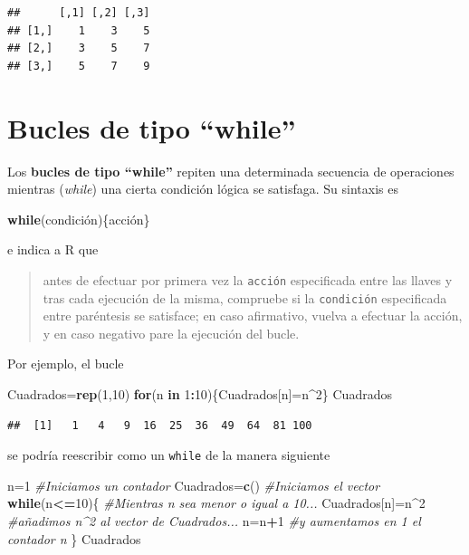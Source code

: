 \documentclass[]{book}
\newenvironment{Shaded}{\begin{snugshade}}{\end{snugshade}}
\newcommand{\CommentTok}[1]{\textcolor[rgb]{0.56,0.35,0.01}{\textit{#1}}}
\newcommand{\ControlFlowTok}[1]{\textcolor[rgb]{0.13,0.29,0.53}{\textbf{#1}}}
\newcommand{\DecValTok}[1]{\textcolor[rgb]{0.00,0.00,0.81}{#1}}
\newcommand{\KeywordTok}[1]{\textcolor[rgb]{0.13,0.29,0.53}{\textbf{#1}}}
\newcommand{\NormalTok}[1]{#1}
\newcommand{\OperatorTok}[1]{\textcolor[rgb]{0.81,0.36,0.00}{\textbf{#1}}}
\theoremstyle{definition}
\theoremstyle{definition}
\theoremstyle{definition}
\theoremstyle{remark}
\begin{document}
\begin{verbatim}
##      [,1] [,2] [,3]
## [1,]    1    3    5
## [2,]    3    5    7
## [3,]    5    7    9
\end{verbatim}

\hypertarget{bucles-de-tipo-while}{%
\section{Bucles de tipo ``while''}\label{bucles-de-tipo-while}}

Los \textbf{bucles de tipo ``while''} repiten una determinada secuencia de operaciones mientras (\emph{while}) una cierta condición lógica se satisfaga. Su sintaxis es

\begin{Shaded}
\begin{Highlighting}[]
\ControlFlowTok{while}\NormalTok{(condición)\{acción\}}
\end{Highlighting}
\end{Shaded}

e indica a R que

\begin{quote}
antes de efectuar por primera vez la \texttt{acción} especificada entre las llaves y tras cada ejecución de la misma, compruebe si la \texttt{condición} especificada entre paréntesis se satisface; en caso afirmativo, vuelva a efectuar la acción, y en caso negativo pare la ejecución del bucle.
\end{quote}

Por ejemplo, el bucle

\begin{Shaded}
\begin{Highlighting}[]
\NormalTok{Cuadrados=}\KeywordTok{rep}\NormalTok{(}\DecValTok{1}\NormalTok{,}\DecValTok{10}\NormalTok{)}
\ControlFlowTok{for}\NormalTok{(n }\ControlFlowTok{in} \DecValTok{1}\OperatorTok{:}\DecValTok{10}\NormalTok{)\{Cuadrados[n]=n}\OperatorTok{^}\DecValTok{2}\NormalTok{\}}
\NormalTok{Cuadrados}
\end{Highlighting}
\end{Shaded}

\begin{verbatim}
##  [1]   1   4   9  16  25  36  49  64  81 100
\end{verbatim}

se podría reescribir como un \texttt{while} de la manera siguiente

\begin{Shaded}
\begin{Highlighting}[]
\NormalTok{n=}\DecValTok{1} \CommentTok{#Iniciamos un contador}
\NormalTok{Cuadrados=}\KeywordTok{c}\NormalTok{() }\CommentTok{#Iniciamos el vector}
\ControlFlowTok{while}\NormalTok{(n}\OperatorTok{<=}\DecValTok{10}\NormalTok{)\{ }\CommentTok{#Mientras n sea menor o igual a 10...}
\NormalTok{  Cuadrados[n]=n}\OperatorTok{^}\DecValTok{2} \CommentTok{#añadimos n^2 al vector de Cuadrados...}
\NormalTok{  n=n}\OperatorTok{+}\DecValTok{1} \CommentTok{#y aumentamos en 1 el contador n}
\NormalTok{\}}
\NormalTok{Cuadrados}
\end{Highlighting}
\end{Shaded}
\end{document}
